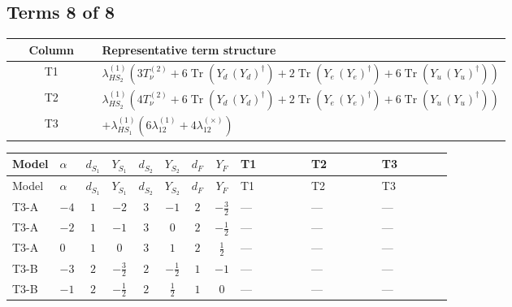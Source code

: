 \documentclass[8pt]{article}
\begin{document}
\begin{landscape}
\subsection*{Terms 8 of 8}
\begin{center}
\begin{tabular}{@{}c >{\raggedright\arraybackslash}p{0.82\linewidth}@{}}
\toprule
Column & Representative term structure \\
\midrule
T1 & \(\displaystyle {\lambda_{HS_2}^{(1)}} (3 T_{\nu}^{(2)}+6 \operatorname{Tr}\!\left({Y_d}\,\left({Y_d}\right)^{\dagger}\right)+2 \operatorname{Tr}\!\left({Y_e}\,\left({Y_e}\right)^{\dagger}\right)+6 \operatorname{Tr}\!\left({Y_u}\,\left({Y_u}\right)^{\dagger}\right))\) \\
\midrule
T2 & \(\displaystyle {\lambda_{HS_2}^{(1)}} (4 T_{\nu}^{(2)}+6 \operatorname{Tr}\!\left({Y_d}\,\left({Y_d}\right)^{\dagger}\right)+2 \operatorname{Tr}\!\left({Y_e}\,\left({Y_e}\right)^{\dagger}\right)+6 \operatorname{Tr}\!\left({Y_u}\,\left({Y_u}\right)^{\dagger}\right))\) \\
\midrule
T3 & \(\displaystyle +{\lambda_{HS_1}^{(1)}} (6 {\lambda_{12}^{(1)}}+4 {\lambda_{12}^{(\times)}})\) \\
\midrule
\bottomrule
\end{tabular}
\end{center}
\smallskip
\tiny
\begin{longtable}{@{}llcccccc >{\raggedright\arraybackslash}p{0.21\linewidth} >{\raggedright\arraybackslash}p{0.21\linewidth} >{\raggedright\arraybackslash}p{0.21\linewidth}@{}}
\toprule
Model & $\alpha$ & $d_{S_1}$ & $Y_{S_1}$ & $d_{S_2}$ & $Y_{S_2}$ & $d_F$ & $Y_F$ & T1 & T2 & T3 \\
\midrule
\endfirsthead
\toprule
Model & $\alpha$ & $d_{S_1}$ & $Y_{S_1}$ & $d_{S_2}$ & $Y_{S_2}$ & $d_F$ & $Y_F$ & T1 & T2 & T3 \\
\midrule
\endhead
T3-A & $-4$ & $1$ & $-2$ & $3$ & $-1$ & $2$ & $-\frac{3}{2}$ & --- & --- & --- \\
\midrule
T3-A & $-2$ & $1$ & $-1$ & $3$ & $0$ & $2$ & $-\frac{1}{2}$ & --- & --- & --- \\
\midrule
T3-A & $0$ & $1$ & $0$ & $3$ & $1$ & $2$ & $\frac{1}{2}$ & --- & --- & --- \\
\midrule
T3-B & $-3$ & $2$ & $-\frac{3}{2}$ & $2$ & $-\frac{1}{2}$ & $1$ & $-1$ & --- & --- & --- \\
\midrule
T3-B & $-1$ & $2$ & $-\frac{1}{2}$ & $2$ & $\frac{1}{2}$ & $1$ & $0$ & --- & --- & --- \\

\end{longtable}
\end{landscape}
\end{document}
